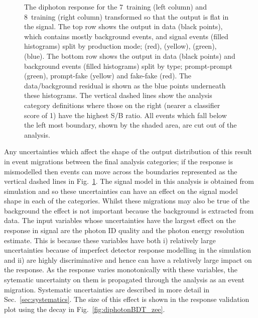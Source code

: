 \begin{figure}
  \caption[The diphoton \acs{BDT} response]{The diphoton \BDT response for the 7~\TeV training (left column) and 8~\TeV training (right column) transformed so that the output is flat in the signal. The top row shows the output in data (black points), which contains mostly background events, and signal \MC events (filled histograms) split by production mode; \ggH (red), \VBF (yellow), \VH (green), \ttH (blue). The bottom row shows the output in data (black points) and background \MC events (filled histograms) split by type; prompt-prompt (green), prompt-fake (yellow) and fake-fake (red). The data/background residual is shown as the blue points underneath these histograms. The vertical dashed lines show the analysis category definitions where those on the right (nearer a classifier score of 1) have the highest S/B ratio. All events which fall below the left most boundary, shown by the shaded area, are cut out of the analysis.}
  \label{fig:dipho_bdt}
\end{figure}

Any uncertainties which affect the shape of the output distribution of this \BDT result in event migrations between the final analysis categories; if the \BDT response is mismodelled then events can move across the boundaries represented as the vertical dashed lines in Fig.~\ref{fig:dipho_bdt}. The signal model in this analysis is obtained from \MC simulation and so these uncertainties can have an effect on the signal model shape in each of the categories. Whilst these migrations may also be true of the background the effect is not important because the background is extracted from data. The input variables whose uncertainties have the largest effect on the \BDT response in signal are the photon ID quality and the photon energy resolution estimate. This is because these variables have both i) relatively large uncertainties because of imperfect detector response modelling in the simulation and ii) are highly discriminative and hence can have a relatively large impact on the \BDT response. As the \BDT response varies monotonically with these variables, the sytematic uncertainty on them is propagated through the analysis as an event migration. Systematic uncertainties are described in more detail in Sec.~\ref{sec:systematics}. The size of this effect is shown in the \BDT response validation plot using the \Zee decay in Fig.~\ref{fig:diphotonBDT_zee}.

